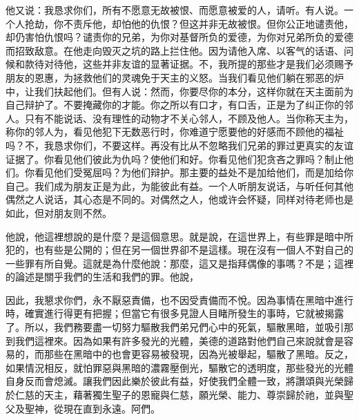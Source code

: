 他又说：我恳求你们，所有不愿意无故被恨、而愿意被爱的人，请听。有人说。一个人抢劫，你不责斥他，却怕他的仇恨？但这并非无故被恨。但你公正地谴责他，却仍害怕仇恨吗？谴责你的兄弟，为你对基督所负的爱德，为你对兄弟所负的爱德而招致敌意。在他走向毁灭之坑的路上拦住他。因为请他入席、以客气的话语、问候和款待对待他，这些并非友谊的显著证据。不，我所提的那些才是我们必须赐予朋友的恩惠，为拯救他们的灵魂免于天主的义怒。当我们看见他们躺在邪恶的炉中，让我们扶起他们。但有人说：然而，你要尽你的本分，这样你就在天主面前为自己辩护了。不要掩藏你的才能。你之所以有口才，有口舌，正是为了纠正你的邻人。只有不能说话、没有理性的动物才不关心邻人，不顾及他人。当你称天主为，称你的邻人为，看见他犯下无数恶行时，你难道宁愿要他的好感而不顾他的福祉吗？不，我恳求你们，不要这样。再没有比从不忽略我们兄弟的罪过更真实的友谊证据了。你看见他们彼此为仇吗？使他们和好。你看见他们犯贪吝之罪吗？制止他们。你看见他们受冤屈吗？为他们辩护。那主要的益处不是加给他们，而是加给你自己。我们成为朋友正是为此，为能彼此有益。一个人听朋友说话，与听任何其他偶然之人说话，其心态是不同的。对偶然之人，他或许会怀疑，同样对待老师也是如此，但对朋友则不然。\par

他說，他這裡想說的是什麼？是這個意思。就是說，在這世界上，有些罪是暗中所犯的，也有些是公開的；但在另一個世界卻不是這樣。現在沒有一個人不對自己的一些罪有所自覺。這就是為什麼他說：那麼，這又是指拜偶像的事嗎？不是；這裡的論述是關乎我們的生活和我們的罪。他說，\par

因此，我懇求你們，永不厭惡責備，也不因受責備而不悅。因為事情在黑暗中進行時，確實進行得更有把握；但當它有很多見證人目睹所發生的事時，它就被揭露了。所以，我們務要盡一切努力驅散我們弟兄們心中的死氣，驅散黑暗，並吸引那到我們這裡來。因為如果有許多發光的光體，美德的道路對他們自己來說就會是容易的，而那些在黑暗中的也會更容易被發現，因為光被舉起，驅散了黑暗。反之，如果情況相反，就怕罪惡與黑暗的濃霧壓倒光，驅散它的透明度，那些發光的光體自身反而會熄滅。讓我們因此樂於彼此有益，好使我們全體一致，將讚頌與光榮歸於仁慈的天主，藉著獨生聖子的恩寵與仁慈，願光榮、能力、尊崇歸於祂，並與聖父及聖神，從現在直到永遠。阿們。\par

